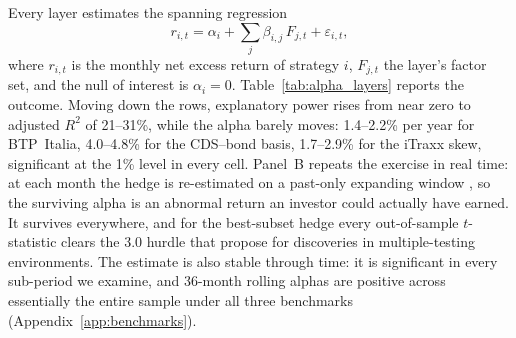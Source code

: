 Every layer estimates the spanning regression
\begin{equation}
r_{i,t} = \alpha_i + \sum_{j}\beta_{i,j}\,F_{j,t} + \varepsilon_{i,t},
\end{equation}
where $r_{i,t}$ is the monthly net excess return of strategy $i$, $F_{j,t}$
the layer's factor set, and the null of interest is $\alpha_i = 0$.
Table~\ref{tab:alpha_layers} reports the outcome. Moving down the rows,
explanatory power rises from near zero to adjusted $R^2$ of 21--31\%, while
the alpha barely moves: 1.4--2.2\% per year for BTP~Italia, 4.0--4.8\% for the
CDS--bond basis, 1.7--2.9\% for the iTraxx skew, significant at the 1\% level
in every cell. Panel~B repeats the exercise in real time: at each month the
hedge is re-estimated on a past-only expanding window
\citep{welch2008comprehensive}, so the surviving alpha is an abnormal return
an investor could actually have earned. It survives everywhere, and for the
best-subset hedge every out-of-sample $t$-statistic clears the 3.0 hurdle that
\citet{harvey2016and} propose for discoveries in multiple-testing
environments. The estimate is also stable through time: it is significant in
every sub-period we examine, and 36-month rolling alphas are positive across
essentially the entire sample under all three benchmarks
(Appendix~\ref{app:benchmarks}).

